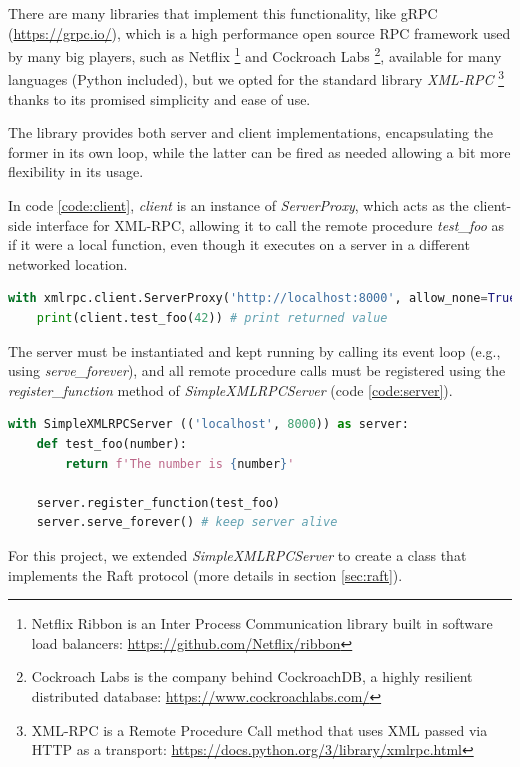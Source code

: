 There are many libraries that implement this functionality, like gRPC (\url{https://grpc.io/}), which is a high performance open source RPC framework used by many big players, such as Netflix \footnote{Netflix Ribbon is an Inter Process Communication library built in software load balancers: \url{https://github.com/Netflix/ribbon}} and Cockroach Labs \footnote{Cockroach Labs is the company behind CockroachDB, a highly resilient distributed database: \url{https://www.cockroachlabs.com/}}, available for many languages (Python included), but we opted for the standard library \textit{XML-RPC} \footnote{XML-RPC is a Remote Procedure Call method that uses XML passed via HTTP as a transport: \url{https://docs.python.org/3/library/xmlrpc.html}} thanks to its promised simplicity and ease of use. 

The library provides both server and client implementations, encapsulating the former in its own loop, while the latter can be fired as needed allowing a bit more flexibility in its usage.

In code \ref{code:client}, \textit{client} is an instance of \textit{ServerProxy}, which acts as the client-side interface for XML-RPC, {allowing it to call} the remote procedure \textit{test\_foo} as if it were a local function, even though it executes on a server in a different networked location.

\begin{lstlisting}[language={Python},label={code:client}, caption={Client as server proxy}]
with xmlrpc.client.ServerProxy('http://localhost:8000', allow_none=True) as client:
    print(client.test_foo(42)) # print returned value
\end{lstlisting}

The server must be instantiated and kept running by calling its event loop (e.g., using \textit{serve\_forever}), and all remote procedure calls must be registered using the \textit{register\_function} method of \textit{SimpleXMLRPCServer} (code \ref{code:server}).

\begin{lstlisting}[language={Python},label={code:server}, caption={Server}]
with SimpleXMLRPCServer (('localhost', 8000)) as server:
    def test_foo(number):
        return f'The number is {number}'

    server.register_function(test_foo)  
    server.serve_forever() # keep server alive
\end{lstlisting}

For this project, we extended \textit{SimpleXMLRPCServer} to create a class that implements the Raft protocol {(more details in section \ref{sec:raft}).}

